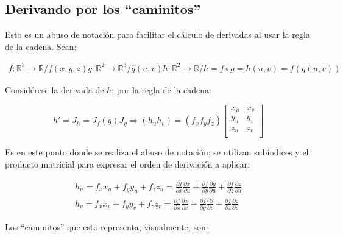 \documentclass{article}
\renewcommand{\Bbb}{\mathbb}
\begin{document}
\subsection{Derivando por los ``caminitos''}

Esto es un abuso de notación para facilitar el cálculo de derivadas al usar la regla de la cadena.
Sean:

\begin{gather}
f: \Bbb R^3 \rightarrow \Bbb R / f(x, y, z)
g: \Bbb R^2 \rightarrow \Bbb R^3 / \overline{g}(u, v)
h: \Bbb R^2 \rightarrow \Bbb R / h = f \circ g = h(u, v) = f(g(u,v))
\end{gather}

Considérese la derivada de $h$; por la regla de la cadena:

\begin{equation}
h' = J_h = J_f(g) J_g \Rightarrow (h_u h_v) = (f_x f_y f_z) 
\begin{bmatrix}
x_u & x_v \\
y_u & y_v \\
z_u & z_v \\
\end{bmatrix}
\end{equation}

Es en este punto donde se realiza el abuso de notación; se utilizan subíndices y el producto matricial para expresar el orden de derivación a aplicar:

\begin{gather}
h_u = f_x x_u + f_y y_u + f_z z_u = \frac{\partial f}{\partial x} \frac{\partial x}{\partial u} + \frac{\partial f}{\partial y} \frac{\partial y}{\partial u} + \frac{\partial f}{\partial z} \frac{\partial z}{\partial u} \\
h_v = f_x x_v + f_y y_v + f_z z_v = \frac{\partial f}{\partial x} \frac{\partial x}{\partial v} + \frac{\partial f}{\partial y} \frac{\partial y}{\partial v} + \frac{\partial f}{\partial z} \frac{\partial z}{\partial v}
\end{gather}

Los ``caminitos'' que esto representa, visualmente, son:
\end{document}
